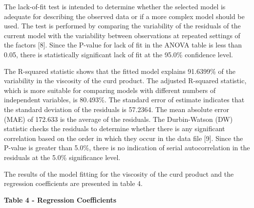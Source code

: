The lack-of-fit test is intended to determine whether the selected model
is adequate for describing the observed data or if a more complex model
should be used. The test is performed by comparing the variability of
the residuals of the current model with the variability between
observations at repeated settings of the factors {[}8{]}. Since the
P-value for lack of fit in the ANOVA table is less than 0.05, there is
statistically significant lack of fit at the 95.0\% confidence level.

The R-squared statistic shows that the fitted model explains 91.6399\%
of the variability in the viscosity of the curd product. The adjusted
R-squared statistic, which is more suitable for comparing models with
different numbers of independent variables, is 80.493\%. The standard
error of estimate indicates that the standard deviation of the residuals
is 57.2364. The mean absolute error (MAE) of 172.633 is the average of
the residuals. The Durbin-Watson (DW) statistic checks the residuals to
determine whether there is any significant correlation based on the
order in which they occur in the data file {[}9{]}. Since the P-value is
greater than 5.0\%, there is no indication of serial autocorrelation in
the residuals at the 5.0\% significance level.

The results of the model fitting for the viscosity of the curd product
and the regression coefficients are presented in table 4.

{\bfseries Table 4 - Regression Coefficients}


